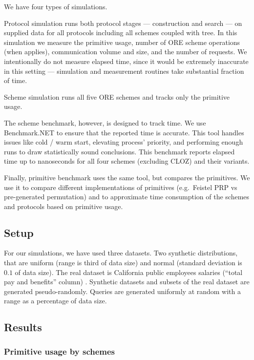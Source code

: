 			

			We have four types of simulations.

			Protocol simulation runs both protocol stages --- construction and search --- on supplied data for all protocols including all schemes coupled with {\BPlus} tree.
			In this simulation we measure the primitive usage, number of ORE scheme operations (when applies), communication volume and size, and the number of {\IO} requests.
			We intentionally do not measure elapsed time, since it would be extremely inaccurate in this setting --- simulation and measurement routines take substantial fraction of time.

			Scheme simulation runs all five ORE schemes and tracks only the primitive usage.

			The scheme benchmark, however, is designed to track time.
			We use Benchmark.NET \cite{benchmark-net} to ensure that the reported time is accurate.
			This tool handles issues like cold / warm start, elevating process' priority, and performing enough runs to draw statistically sound conclusions.
			This benchmark reports elapsed time up to nanoseconds for all four schemes (excluding CLOZ) and their variants.

			Finally, primitive benchmark uses the same tool, but compares the primitives.
			We use it to compare different implementations of primitives (e.g.\ Feistel PRP vs pre-generated permutation) and to approximate time consumption of the schemes and protocols based on primitive usage.

	\subsection{Setup}

		For our simulations, we have used three datasets.
		Two synthetic distributions, that are uniform (range is third of data size) and normal (standard deviation is $0.1$ of data size).
		The real dataset is California public employees salaries (``total pay and benefits'' column) \cite{ca-dataset}.
		Synthetic datasets and subsets of the real dataset are generated pseudo\hyp{}randomly.
		Queries are generated uniformly at random with a range as a percentage of data size.

	\subsection{Results}

		\subsubsection{Primitive usage by schemes}\label{sec:schemes-primitive-usage}


